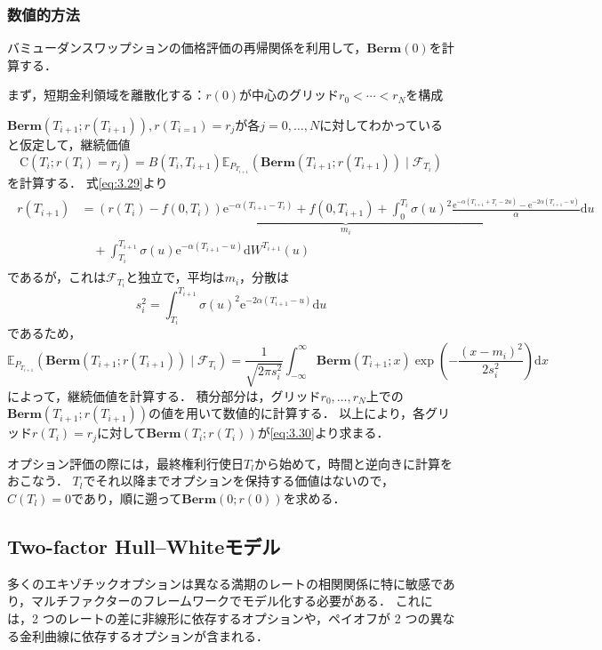 \documentclass[a4paper, lualatex, ja=standard]{bxjsarticle}
\theoremstyle{theorem}
\theoremstyle{definition}
\theoremstyle{definition}
\newcommand{\F}{\mathcal{F}}
\newcommand{\E}{\mathbb{E}}
\newcommand{\Berm}{\mathbf{Berm}}
\newcommand{\diff}{\mathrm{d}}
\begin{document}
\subsubsection*{数値的方法}
バミューダンスワップションの価格評価の再帰関係を利用して，$\Berm(0)$を計算する．

まず，短期金利領域を離散化する：$r(0)$が中心のグリッド$r_0<\cdots<r_N$を構成

$\Berm(T_{i+1}; r(T_{i+1})), r(T_{i=1})=r_j$が各$j=0,\ldots,N$に対してわかっていると仮定して，継続価値
\begin{equation*}
  \mathrm{C}\left(T_i; r(T_i)=r_j\right)=B\left(T_i, T_{i+1}\right) \E_{P_{T_{i+1}}}\left(\Berm\left(T_{i+1}; r(T_{i+1})\right) \mid \mathcal{F}_{T_i}\right)
\end{equation*}
を計算する．
式\eqref{eq:3.29}より
\begin{align*}
\begin{aligned}
  r(T_{i+1}) &=  \underbrace{(r(T_i)-f(0, T_i)) \mathrm{e}^{-\alpha(T_{i+1}-T_{i})}+f(0, T_{i+1}) 
   +\int_0^{T_i} \sigma(u)^2 \frac{\mathrm{e}^{-\alpha(T_{i+1}+T_i-2 u)}-\mathrm{e}^{-2 \alpha(T_{i+1}-u)}}{\alpha} \diff  u}_{m_i} \\
   &\quad+\int_{T_i}^{T_{i+1}} \sigma(u) \mathrm{e}^{-\alpha(T_{i+1}-u)} \diff  W^{T_{i+1}}(u)
  \end{aligned}
\end{align*}
であるが，これは$\F_{T_i}$と独立で，平均は$m_i$，分散は
\begin{equation*}
  s_i^2 = \int_{T_i}^{T_{i+1}} \sigma(u)^2 \mathrm{e}^{-2\alpha(T_{i+1}-u)} \diff u
\end{equation*}
であるため，
\begin{equation*}
  \E_{P_{T_{i+1}}}(\Berm(T_{i+1};r(T_{i+1}))\mid \F_{T_i}) = \frac{1}{\sqrt{2\pi s_i^2}}\int_{-\infty}^\infty \Berm(T_{i+1};x)\exp\left(-\frac{(x-m_i)^2}{2s_i^2}\right)\diff x
\end{equation*}
によって，継続価値を計算する．
積分部分は，グリッド$r_0,\ldots,r_N$上での$\Berm(T_{i+1};r(T_{i+1}))$の値を用いて数値的に計算する．
以上により，各グリッド$r(T_i)=r_j$に対して$\Berm(T_i;r(T_i))$が\eqref{eq:3.30}より求まる．

オプション評価の際には，最終権利行使日$T_l$から始めて，時間と逆向きに計算をおこなう．
$T_l$でそれ以降までオプションを保持する価値はないので，$C(T_l)=0$であり，順に遡って$\Berm(0;r(0))$を求める．

\subsection{Two-factor Hull--Whiteモデル}
多くのエキゾチックオプションは異なる満期のレートの相関関係に特に敏感であり，マルチファクターのフレームワークでモデル化する必要がある．
これには，2 つのレートの差に非線形に依存するオプションや，ペイオフが 2 つの異なる金利曲線に依存するオプションが含まれる．
\end{document}

